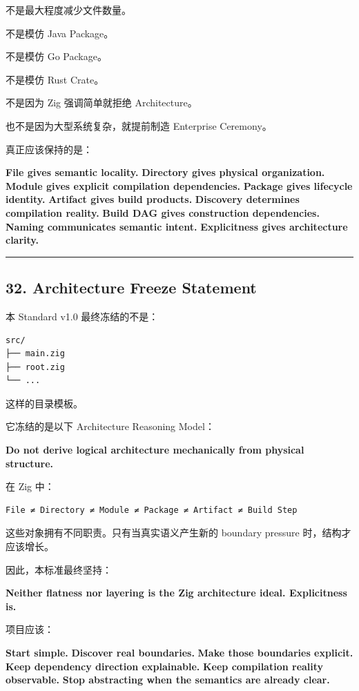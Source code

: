 \documentclass[11pt,a4paper]{article}
\begin{document}
不是最大程度减少文件数量。

不是模仿 Java Package。

不是模仿 Go Package。

不是模仿 Rust Crate。

不是因为 Zig 强调简单就拒绝 Architecture。

也不是因为大型系统复杂，就提前制造 Enterprise Ceremony。

真正应该保持的是：

\begin{gfmBlockquote}
\textbf{File gives semantic locality.}
\textbf{Directory gives physical organization.}
\textbf{Module gives explicit compilation dependencies.}
\textbf{Package gives lifecycle identity.}
\textbf{Artifact gives build products.}
\textbf{Discovery determines compilation reality.}
\textbf{Build DAG gives construction dependencies.}
\textbf{Naming communicates semantic intent.}
\textbf{Explicitness gives architecture clarity.}
\end{gfmBlockquote}
\vspace{0.5em}\hrule\vspace{0.5em}
\subsection{32. Architecture Freeze Statement}
本 Standard v1.0 最终冻结的不是：

\begin{lstlisting}[language=text]
src/
├── main.zig
├── root.zig
└── ...
\end{lstlisting}
这样的目录模板。

它冻结的是以下 Architecture Reasoning Model：

\begin{gfmBlockquote}
\textbf{Do not derive logical architecture mechanically from physical structure.}
\end{gfmBlockquote}
在 Zig 中：

\begin{lstlisting}[language=text]
File ≠ Directory ≠ Module ≠ Package ≠ Artifact ≠ Build Step
\end{lstlisting}
这些对象拥有不同职责。只有当真实语义产生新的 boundary pressure 时，结构才应该增长。

因此，本标准最终坚持：

\begin{gfmBlockquote}
\textbf{Neither flatness nor layering is the Zig architecture ideal. Explicitness is.}
\end{gfmBlockquote}
项目应该：

\begin{gfmBlockquote}
\textbf{Start simple.}
\textbf{Discover real boundaries.}
\textbf{Make those boundaries explicit.}
\textbf{Keep dependency direction explainable.}
\textbf{Keep compilation reality observable.}
\textbf{Stop abstracting when the semantics are already clear.}
\end{gfmBlockquote}
\end{document}
